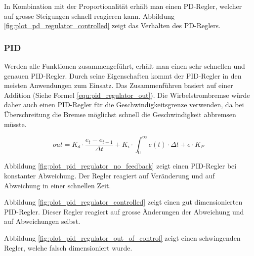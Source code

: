 In Kombination mit der Proportionalität erhält man einen PD-Regler, welcher auf grosse Steigungen schnell reagieren kann. Abbildung \ref{fig:plot_pd_regulator_controlled} zeigt das Verhalten des PD-Reglers.



\newpara

\subsubsection{PID}
Werden alle Funktionen zusammengeführt, erhält man einen sehr schnellen und genauen PID-Regler. Durch seine Eigenschaften kommt der PID-Regler in den meisten Anwendungen zum Einsatz. Das Zusammenführen basiert auf einer Addition (Siehe Formel \ref{equ:pid_regulator_out}). Die Wirbelstrombremse würde daher auch einen PID-Regler für die Geschwindigkeitsgrenze verwenden, da bei Überschreitung die Bremse möglichst schnell die Geschwindigkeit abbremsen müsste.

\begin{equation}
  \label{equ:pid_regulator_out}
  out= K_d\cdot \frac{e_t-e_{t-1}}{\Delta t} + K_i\cdot \int_0^\infty{e(t)\cdot \Delta t} + e\cdot K_P
\end{equation}

Abbildung \ref{fig:plot_pid_regulator_no_feedback} zeigt einen PID-Regler bei konstanter Abweichung. Der Regler reagiert auf Veränderung und auf Abweichung in einer schnellen Zeit.



Abbildung \ref{fig:plot_pid_regulator_controlled} zeigt einen gut dimensionierten PID-Regler. Dieser Regler reagiert auf grosse Änderungen der Abweichung und auf Abweichungen selbst.



Abbildung \ref{fig:plot_pid_regulator_out_of_control} zeigt einen schwingenden Regler, welche falsch dimensioniert wurde.



